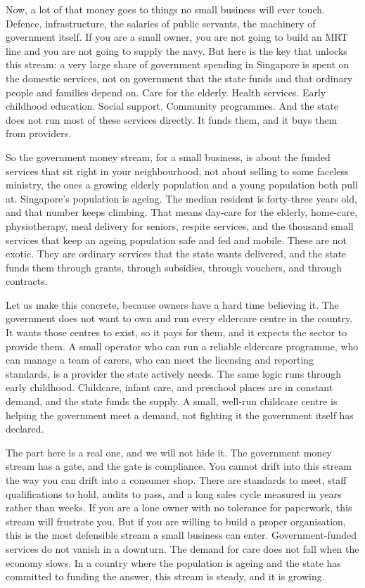 \documentclass[10pt,twoside,openany]{memoir}
\begin{document}
{{{{{{{{{{{{{{Now, a lot of that money goes to things no small business will ever
touch. Defence, infrastructure, the salaries of public servants, the
machinery of government itself. If you are a small owner, you are not
going to build an MRT line and you are not going to supply the navy. But
here is the key that unlocks this stream: a very large share of
government spending in Singapore is spent on the domestic services, not
on government that the state funds and that ordinary people and families
depend on. Care for the elderly. Health services. Early childhood
education. Social support. Community programmes. And the state does not
run most of these services directly. It funds them, and it buys them
from providers.

So the government money stream, for a small business, is about the
funded services that sit right in your neighbourhood, not about selling
to some faceless ministry, the ones a growing elderly population and a
young population both pull at. Singapore's population is ageing. The
median resident is forty-three years old, and that number keeps
climbing. That means day-care for the elderly, home-care, physiotherapy,
meal delivery for seniors, respite services, and the thousand small
services that keep an ageing population safe and fed and mobile. These
are not exotic. They are ordinary services that the state wants
delivered, and the state funds them through grants, through subsidies,
through vouchers, and through contracts.

Let us make this concrete, because owners have a hard time believing it.
The government does not want to own and run every eldercare centre in
the country. It wants those centres to exist, so it pays for them, and
it expects the sector to provide them. A small operator who can run a
reliable eldercare programme, who can manage a team of carers, who can
meet the licensing and reporting standards, is a provider the state
actively needs. The same logic runs through early childhood. Childcare,
infant care, and preschool places are in constant demand, and the state
funds the supply. A small, well-run childcare centre is helping the
government meet a demand, not fighting it the government itself has
declared.

The part here is a real one, and we will not hide it. The government
money stream has a gate, and the gate is compliance. You cannot drift
into this stream the way you can drift into a consumer shop. There are
standards to meet, staff qualifications to hold, audits to pass, and a
long sales cycle measured in years rather than weeks. If you are a lone
owner with no tolerance for paperwork, this stream will frustrate you.
But if you are willing to build a proper organisation, this is the most
defensible stream a small business can enter. Government-funded services
do not vanish in a downturn. The demand for care does not fall when the
economy slows. In a country where the population is ageing and the state
has committed to funding the answer, this stream is steady, and it is
growing.

}}}}}}}}}}}}}}
\end{document}
